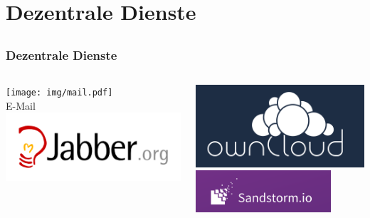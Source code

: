 \documentclass[12pt, xcolor={svgnames,table}]{beamer}
\begin{document}
\section{Dezentrale Dienste}
\subsection{}

\begin{frame}
  \frametitle{Dezentrale Dienste}
    \begin{columns}
        \begin{column}{5cm}
            \begin{center}
                \texttt{[image: img/mail.pdf]} \\
                E-Mail \\
                \vspace{1cm}
                \includegraphics[height=0.2\textheight]{img/jabber.png}
            \end{center}
        \end{column}
        \begin{column}{5cm}
            \begin{center}
                \includegraphics[height=0.2\textheight]{img/owncloud.png} \\
                \vspace{1cm}
                \includegraphics[width=0.8\textwidth]{img/sandstorm.png}
            \end{center}
        \end{column}
    \end{columns}
\end{frame}
\end{document}

